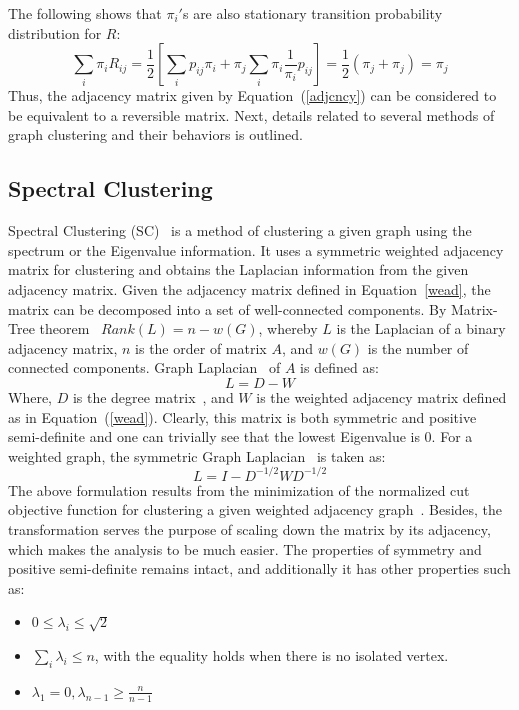 The following shows that $\pi_i'$s are also stationary transition probability distribution for $R$:
\begin{equation*}
\sum_i \pi_i R_{ij} = \frac{1}{2}\left[ \sum_i p_{ij} \pi_i + \pi_j \sum_i \pi_i \frac{1}{\pi_i} p_{ij} \right] = \frac{1}{2} \left(\pi_j + \pi_j  \right) = \pi_j
\end{equation*}
Thus, the adjacency matrix given by Equation~(\ref{adjcncy}) can be considered to be equivalent to a reversible matrix. Next, details related to several methods of graph clustering and their behaviors is outlined.


\subsection{Spectral Clustering}

Spectral Clustering (SC)~\cite{von2007tutorial} is a method of clustering a given graph using the spectrum or the Eigenvalue information. It uses a symmetric weighted adjacency matrix for clustering and obtains the Laplacian information from the given adjacency matrix. Given the adjacency matrix defined in Equation~\ref{wead}, the matrix can be decomposed into a set of well-connected components. By Matrix-Tree theorem~\cite{merris1994laplacian} $Rank(L) = n - w(G)$, whereby $L$ is the Laplacian of a binary adjacency matrix, $n$ is the order of matrix $A$, and $w(G)$ is the number of connected components. 
Graph Laplacian~\cite{merris1994laplacian,mohar1991laplacian} of $A$ is defined as:
\begin{equation}
L = D - W
\end{equation}
Where, $D$ is the degree matrix~\cite{bollobas1982graph}, and $W$ is the weighted adjacency matrix defined as in Equation~(\ref{wead}). Clearly, this matrix is both symmetric and positive semi-definite and one can trivially see that the lowest Eigenvalue is 0. For a weighted graph, the symmetric Graph Laplacian~\cite{chung1997spectral} is taken as:
\begin{equation}
\label{graphlap}
L = I - D^{-1/2} W D^{-1/2}
\end{equation}
The above formulation results from the minimization of the normalized cut objective function for clustering a given weighted adjacency graph~\cite{shi2000normalized}. Besides, the transformation serves the purpose of scaling down the matrix by its adjacency, which makes the analysis to be much easier. The properties of symmetry and positive semi-definite remains intact, and additionally it has other properties such as:
\begin{itemize}
\item $0 \leq \lambda_i \leq \sqrt{2}$
\item $\sum_i \lambda_i \leq n$, with the equality holds when there is no isolated vertex. 
\item $\lambda_1 =0, \lambda_{n-1} \geq \frac{n}{n-1} $
\end{itemize} 

